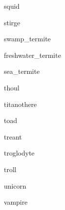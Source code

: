 \documentclass[letterpaper,serif]{module}
\begin{document}
\begin{newmonster}{squid}\end{newmonster}

\begin{newmonster}{stirge}\end{newmonster}


\begin{newmonster}{swamp_termite}\end{newmonster}

\begin{newmonster}{freshwater_termite}\end{newmonster}

\begin{newmonster}{sea_termite}\end{newmonster}

\begin{newmonster}{thoul}\end{newmonster}

\begin{newmonster}{titanothere}\end{newmonster}

\begin{newmonster}{toad}\end{newmonster}

\begin{newmonster}{treant}\end{newmonster}

\begin{newmonster}{troglodyte}\end{newmonster}

\begin{newmonster}{troll}\end{newmonster}

\begin{newmonster}{unicorn}\end{newmonster}

\begin{newmonster}{vampire}\end{newmonster}
\end{document}
